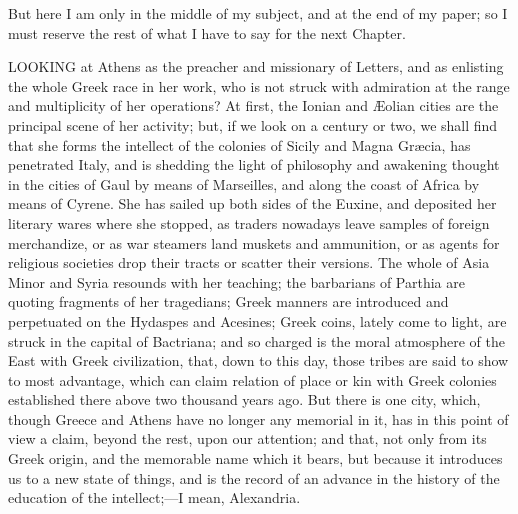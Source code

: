 But here I am only in the middle of my subject, and at the end of
my paper; so I must reserve the rest of what I have to say for the
next Chapter.


LOOKING at Athens as the preacher and
missionary of Letters, and as enlisting the whole Greek race in her
work, who is not struck with admiration at the range and multiplicity
of her operations? At first, the Ionian and Æolian cities are the
principal scene of her activity; but, if we look on a century or two,
we shall find that she forms the intellect of the colonies of Sicily
and Magna Græcia, has penetrated Italy, and is shedding the light of
philosophy and awakening thought in the cities of Gaul by means of
Marseilles, and along the coast of Africa by means of Cyrene. She has
sailed up both sides of the Euxine, and deposited her literary wares
where she stopped, as traders nowadays leave samples of foreign
merchandize, or as war steamers land muskets and ammunition, or as
agents for religious societies drop their tracts or scatter their
versions. The whole of Asia Minor and Syria resounds with her
teaching; the barbarians of Parthia are quoting fragments of her
tragedians; Greek manners are introduced and perpetuated on the
Hydaspes and Acesines; Greek coins, lately come to light, are struck
in the capital of Bactriana; and so charged is the moral atmosphere of
the East with Greek civilization, that, down to this day, those tribes
are said to show to most advantage, which can claim relation of
place or kin with Greek colonies established there above two thousand
years ago. But there is one city, which, though Greece and Athens have
no longer any memorial in it, has in this point of view a claim,
beyond the rest, upon our attention; and that, not only from its Greek
origin, and the memorable name which it bears, but because it
introduces us to a new state of things, and is the record of an
advance in the history of the education of the intellect;—I mean,
Alexandria.

